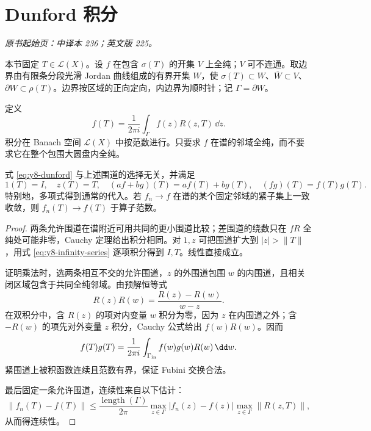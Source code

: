 \section{Dunford 积分}\label{sec:yosida-08-07}
\noindent\textit{原书起始页：中译本 236；英文版 225。}

本节固定 $T\in\mathcal L(X)$。设 $f$ 在包含 $\sigma(T)$ 的开集 $V$ 上全纯；$V$ 可不连通。取边界由有限条分段光滑 Jordan 曲线组成的有界开集 $W$，使
$\sigma(T)\subset W$、$\overline W\subset V$、$\partial W\subset\rho(T)$。边界按区域的正向定向，内边界为顺时针；记 $\Gamma=\partial W$。

\begin{definition}[全纯函数的算子值]
定义
\begin{equation}\label{eq:y8-dunford}
 f(T)=\frac1{2\pi i}\int_\Gamma f(z)R(z,T)\,\dd z.
\end{equation}
积分在 Banach 空间 $\mathcal L(X)$ 中按范数进行。只要求 $f$ 在谱的邻域全纯，而不要求它在整个包围大圆盘内全纯。
\end{definition}

\begin{theorem}[全纯演算的代数性质]\label{thm:y8-holomorphic-calculus}
式 \eqref{eq:y8-dunford} 与上述围道的选择无关，并满足
\[
 1(T)=I,\quad z(T)=T,\quad
 (af+bg)(T)=af(T)+bg(T),\quad (fg)(T)=f(T)g(T).
\]
特别地，多项式得到通常的代入。若 $f_n\to f$ 在谱的某个固定邻域的紧子集上一致收敛，则 $f_n(T)\to f(T)$ 于算子范数。
\end{theorem}
\begin{proof}
两条允许围道在谱附近可用共同的更小围道比较；差围道的绕数只在 $fR$ 全纯处可能非零，Cauchy 定理给出积分相同。对 $1,z$ 可把围道扩大到 $|z|>\|T\|$，用式 \eqref{eq:y8-infinity-series} 逐项积分得到 $I,T$。线性直接成立。

证明乘法时，选两条相互不交的允许围道，$z$ 的外围道包围 $w$ 的内围道，且相关闭区域包含于共同全纯邻域。由预解恒等式
\[
 R(z)R(w)=\frac{R(z)-R(w)}{w-z}.
\]
在双积分中，含 $R(z)$ 的项对内变量 $w$ 积分为零，因为 $z$ 在内围道之外；含 $-R(w)$ 的项先对外变量 $z$ 积分，Cauchy 公式给出 $f(w)R(w)$。因而
\[
 f(T)g(T)=\frac1{2\pi i}\int_{\Gamma_{\rm in}}f(w)g(w)R(w)\,\dd w.
\]
紧围道上被积函数连续且范数有界，保证 Fubini 交换合法。
\par{}
最后固定一条允许围道，连续性来自以下估计：
\begin{equation}\label{eq:y8-calculus-bound}
 \|f_n(T)-f(T)\|\le
 \frac{\operatorname{length}(\Gamma)}{2\pi}
 \max_{z\in\Gamma}|f_n(z)-f(z)|\max_{z\in\Gamma}\|R(z,T)\|,
\end{equation}
从而得连续性。
\end{proof}

